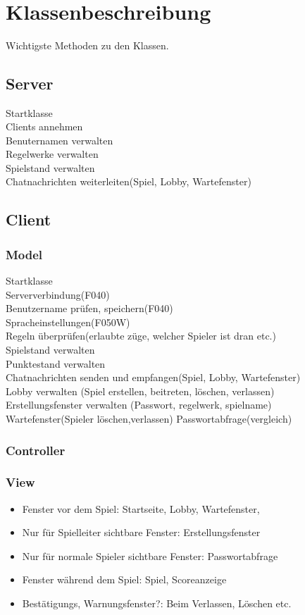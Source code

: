 \documentclass{article}
\begin{document}
\ \\
\section{Klassenbeschreibung}
Wichtigste Methoden zu den Klassen.
	\subsection{Server}
		Startklasse \\
		Clients annehmen \\
		Benuternamen verwalten \\
		Regelwerke verwalten \\
		Spielstand verwalten \\
		Chatnachrichten weiterleiten(Spiel, Lobby, Wartefenster) \\
	\subsection{Client}
	\subsubsection{Model}
		Startklasse \\
		Serververbindung(F040)\\
		Benutzername prüfen, speichern(F040)\\
		Spracheinstellungen(F050W) \\
		Regeln überprüfen(erlaubte züge, welcher Spieler ist dran etc.)\\
		Spielstand verwalten \\
		Punktestand verwalten\\
		Chatnachrichten senden und empfangen(Spiel, Lobby, Wartefenster) \\
		Lobby	verwalten (Spiel erstellen, beitreten, löschen, verlassen)\\	
		Erstellungsfenster verwalten (Passwort, regelwerk, spielname)\\
		Wartefenster(Spieler löschen,verlassen)
		Passwortabfrage(vergleich)\\
	\subsubsection{Controller}
	\subsubsection{View}
		\begin{itemize}
			\item{Fenster vor dem Spiel}: Startseite, Lobby, Wartefenster, 
			\item{Nur für Spielleiter sichtbare Fenster}: Erstellungsfenster
			\item{Nur für normale Spieler sichtbare Fenster}: Passwortabfrage
			\item{Fenster während dem Spiel}: Spiel, Scoreanzeige
			\item{Bestätigungs, Warnungsfenster?}: Beim Verlassen, Löschen etc.
		\end{itemize}
\end{document}
